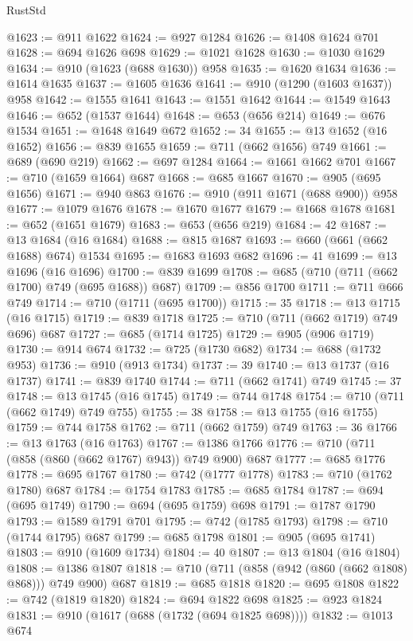 \begin{lexlean}{RustStd}
\begin{coremodule}
@1623 := @911 @1622
@1624 := @927 @1284
@1626 := @1408 @1624 @701
@1628 := @694 @1626 @698
@1629 := @1021 @1628
@1630 := @1030 @1629
@1634 := @910 (@1623 (@688 @1630)) @958
@1635 := @1620 @1634
@1636 := @1614 @1635
@1637 := @1605 @1636
@1641 := @910 (@1290 (@1603 @1637)) @958
@1642 := @1555 @1641
@1643 := @1551 @1642
@1644 := @1549 @1643
@1646 := @652 (@1537 @1644)
@1648 := @653 (@656 @214)
@1649 := @676 @1534
@1651 := @1648 @1649 @672
@1652 := 34
@1655 := @13 @1652 (@16 @1652)
@1656 := @839 @1655
@1659 := @711 (@662 @1656) @749
@1661 := @689 (@690 @219)
@1662 := @697 @1284
@1664 := @1661 @1662 @701
@1667 := @710 (@1659 @1664) @687
@1668 := @685 @1667
@1670 := @905 (@695 @1656)
@1671 := @940 @863
@1676 := @910 (@911 @1671 (@688 @900)) @958
@1677 := @1079 @1676
@1678 := @1670 @1677
@1679 := @1668 @1678
@1681 := @652 (@1651 @1679)
@1683 := @653 (@656 @219)
@1684 := 42
@1687 := @13 @1684 (@16 @1684)
@1688 := @815 @1687
@1693 := @660 (@661 (@662 @1688) @674) @1534
@1695 := @1683 @1693 @682
@1696 := 41
@1699 := @13 @1696 (@16 @1696)
@1700 := @839 @1699
@1708 := @685 (@710 (@711 (@662 @1700) @749 (@695 @1688)) @687)
@1709 := @856 @1700
@1711 := @711 @666 @749
@1714 := @710 (@1711 (@695 @1700))
@1715 := 35
@1718 := @13 @1715 (@16 @1715)
@1719 := @839 @1718
@1725 := @710 (@711 (@662 @1719) @749 @696) @687
@1727 := @685 (@1714 @1725)
@1729 := @905 (@906 @1719)
@1730 := @914 @674
@1732 := @725 (@1730 @682)
@1734 := @688 (@1732 @953)
@1736 := @910 (@913 @1734)
@1737 := 39
@1740 := @13 @1737 (@16 @1737)
@1741 := @839 @1740
@1744 := @711 (@662 @1741) @749
@1745 := 37
@1748 := @13 @1745 (@16 @1745)
@1749 := @744 @1748
@1754 := @710 (@711 (@662 @1749) @749 @755)
@1755 := 38
@1758 := @13 @1755 (@16 @1755)
@1759 := @744 @1758
@1762 := @711 (@662 @1759) @749
@1763 := 36
@1766 := @13 @1763 (@16 @1763)
@1767 := @1386 @1766
@1776 := @710 (@711 (@858 (@860 (@662 @1767) @943)) @749 @900) @687
@1777 := @685 @1776
@1778 := @695 @1767
@1780 := @742 (@1777 @1778)
@1783 := @710 (@1762 @1780) @687
@1784 := @1754 @1783
@1785 := @685 @1784
@1787 := @694 (@695 @1749)
@1790 := @694 (@695 @1759) @698
@1791 := @1787 @1790
@1793 := @1589 @1791 @701
@1795 := @742 (@1785 @1793)
@1798 := @710 (@1744 @1795) @687
@1799 := @685 @1798
@1801 := @905 (@695 @1741)
@1803 := @910 (@1609 @1734)
@1804 := 40
@1807 := @13 @1804 (@16 @1804)
@1808 := @1386 @1807
@1818 := @710 (@711 (@858 (@942 (@860 (@662 @1808) @868))) @749 @900) @687
@1819 := @685 @1818
@1820 := @695 @1808
@1822 := @742 (@1819 @1820)
@1824 := @694 @1822 @698
@1825 := @923 @1824
@1831 := @910 (@1617 (@688 (@1732 (@694 @1825 @698))))
@1832 := @1013 @674

\end{coremodule}
\end{lexlean}
